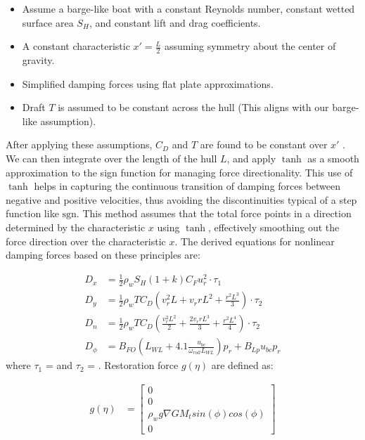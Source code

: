 \documentclass[conference]{IEEEtran}
\begin{document}
\begin{itemize}
\item Assume a barge-like boat with a constant Reynolds number, constant wetted surface area $S_H$, and constant lift and drag coefficients.
\item A constant characteristic \( x' = \frac{L}{2} \) assuming symmetry about the center of gravity.
\item Simplified damping forces using flat plate approximations.
\item  Draft $T$ is assumed to be constant across the hull (This aligns with our barge-like assumption).
\end{itemize}

After applying these assumptions, $ C_D$ and $T$ are found to be constant over $ x' $ . We can then integrate over the length of the hull $L$, and apply \(\tanh\) as a smooth approximation to the sign function for managing force directionality. This use of \(\tanh\) helps in capturing the continuous transition of damping forces between negative and positive velocities, thus avoiding the discontinuities typical of a step function like \(\text{sgn}\). This method assumes that the total force points in a direction determined by the characteristic \( x \) using \(\tanh\), effectively smoothing out the force direction over the characteristic \( x \). The derived equations for nonlinear damping forces based on these principles are:

\begin{align}
D_x &= \frac{1}{2} \rho_w S_H (1+k) C_F u_r^2 \cdot \tau_1 \\
D_y &= \frac{1}{2} \rho_w T C_D \left(v_r^2 L + v_r r L^2 + \frac{r^2 L^3}{3}\right) \cdot \tau_2 \\
D_n &= \frac{1}{2} \rho_w T C_D \left(\frac{v_r^2 L^2}{2} + \frac{2 v_r r L^3}{3} + \frac{r^2 L^4}{4}\right) \cdot \tau_2 \\
D_{\phi} &= B_{FO} \left(L_{WL} + 4.1 \frac{u_{bc}}{\omega_{roll} L_{WL}}\right) p_r + B_{Lp} u_{bc} p_r
\end{align}
where $\tau_1$ =  and  $\tau_2$ = . Restoration force $g(\eta)$ are defined as:

\begin{align}
g(\eta) &= \begin{bmatrix}
0\\
0\\
\rho_w g \nabla G M_t sin(\phi)cos(\phi)\\
0
\end{bmatrix}
\end{align}
\end{document}
